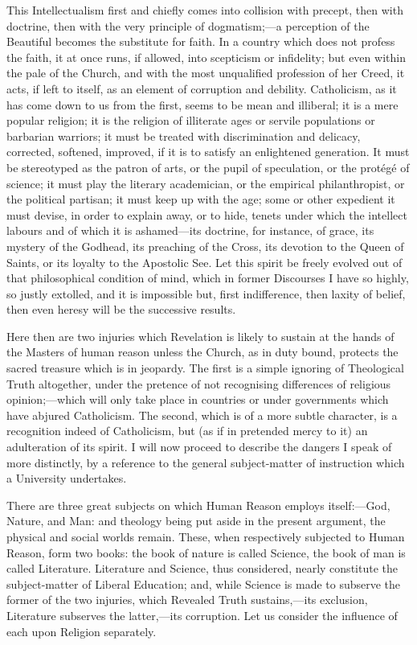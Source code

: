 This Intellectualism first and chiefly comes into collision with
precept, then with doctrine, then with the very principle of
dogmatism;—a perception of the Beautiful becomes the substitute for
faith. In a country which does not profess the faith, it at once runs,
if allowed, into scepticism or infidelity; but even within the pale of
the Church, and with the most unqualified profession of her Creed, it
acts, if left to itself, as an element of corruption and debility.
Catholicism, as it has come down to us from the first, seems to be
mean and illiberal; it is a mere popular religion; it is the religion
of illiterate ages or servile populations or barbarian warriors; it
must be treated with discrimination and delicacy, corrected, softened,
improved, if it is to satisfy an enlightened generation. It must be
stereotyped as the patron of arts, or the pupil of speculation, or the
protégé of science; it must play the literary academician, or the
empirical philanthropist, or the political partisan; it must keep up
with the age; some or other expedient it must devise, in order to
explain away, or to hide, tenets under which the intellect labours and
of which it is ashamed—its doctrine, for instance, of grace, its
mystery of the Godhead, its preaching of the Cross, its devotion to
the Queen of Saints, or its loyalty to the Apostolic See. Let this
spirit be freely evolved out of that philosophical condition of mind,
which in former Discourses I have so highly, so justly extolled, and
it is impossible but, first indifference, then laxity of belief, then
even heresy will be the successive results.

Here then are two injuries which Revelation is likely to sustain at
the hands of the Masters of human reason unless the Church, as in duty
bound, protects the sacred treasure which is in jeopardy. The
first is a simple ignoring of Theological Truth altogether, under the
pretence of not recognising differences of religious opinion;—which
will only take place in countries or under governments which have
abjured Catholicism. The second, which is of a more subtle character,
is a recognition indeed of Catholicism, but (as if in pretended mercy
to it) an adulteration of its spirit. I will now proceed to describe
the dangers I speak of more distinctly, by a reference to the general
subject-matter of instruction which a University undertakes.

There are three great subjects on which Human Reason employs
itself:—God, Nature, and Man: and theology being put aside in the
present argument, the physical and social worlds remain. These, when
respectively subjected to Human Reason, form two books: the book of
nature is called Science, the book of man is called Literature.
Literature and Science, thus considered, nearly constitute the
subject-matter of Liberal Education; and, while Science is made to
subserve the former of the two injuries, which Revealed Truth
sustains,—its exclusion, Literature subserves the latter,—its
corruption. Let us consider the influence of each upon Religion
separately.

